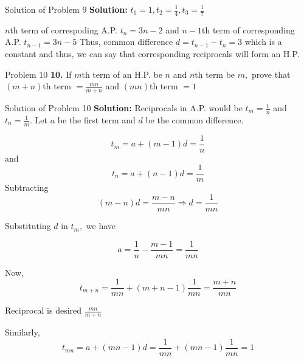 \documentclass[aspectratio=1610,8pt]{beamer}
\begin{document}
\begin{frame}{Solution of Problem 9}
  \textbf{Solution:} $t_1 = 1, t_2 = \frac{1}{4}, t_3 = \frac{1}{7}$

  $n$th term of correspoding A.P. $t_n = 3n - 2$ and $n - 1$th term of
  corresponding A.P. $t_{n - 1} = 3n - 5$ Thus, common difference $d = t_{n -
    1} - t_n = 3$ which is a constant and thus, we can say that corresponding
  reciprocals will form an H.P.
\end{frame}
\begin{frame}{Problem 10}
  \textbf{10.} If $m$th term of an H.P. be $n$ and $n$th term be $m,$ prove
  that $(m + n)$th term $= \frac{mn}{m + n}$ and $(mn)$th term $= 1$
\end{frame}
\begin{frame}{Solution of Problem 10}
  \textbf{Solution:} Reciprocals in A.P. would be $t_m = \frac{1}{n}$ and $t_n
  = \frac{1}{m}.$ Let $a$ be the first term and $d$ be the common difference.

  $$t_m = a + (m - 1)d = \frac{1}{n}$$
  and $$t_n = a + (n - 1)d = \frac{1}{m}$$
  Subtracting $$(m - n)d = \frac{m - n}{mn}\Rightarrow d = \frac{1}{mn}$$

  Substituting $d$ in $t_m,$ we have

  $$a= \frac{1}{n} - \frac{m - 1}{mn} = \frac{1}{mn}$$

  Now, $$t_{m + n} = \frac{1}{mn} + (m + n - 1)\frac{1}{mn} = \frac{m +
    n}{mn}$$

  Reciprocal is desired $\frac{mn}{m + n}$

  Similarly, $$t_{mn} = a + (mn - 1)d = \frac{1}{mn} + (mn - 1)\frac{1}{mn} =
  1$$
\end{frame}
\end{document}
